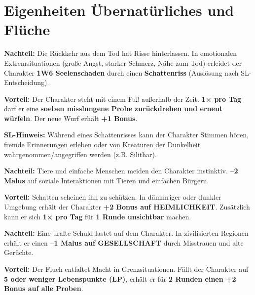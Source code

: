 \section{Eigenheiten Übernatürliches und Flüche}

\begin{traitbox}{}
	
	\textbf{Nachteil:}  
	Die Rückkehr aus dem Tod hat Risse hinterlassen.
	In emotionalen Extremsituationen (große Angst, starker Schmerz, Nähe zum Tod)
	erleidet der Charakter \textbf{1W6 Seelenschaden} durch einen \textbf{Schattenriss}
	(Auslösung nach SL-Entscheidung).
	
	\medskip
	\textbf{Vorteil:}  
	Der Charakter steht mit einem Fuß außerhalb der Zeit.
	\textbf{1× pro Tag} darf er eine \textbf{soeben misslungene Probe}
	\textbf{zurückdrehen und erneut würfeln}.
	Der neue Wurf erhält \textbf{+1 Bonus}.
	
	\medskip
	\textbf{SL-Hinweis:}  
	Während eines Schattenrisses kann der Charakter Stimmen hören,
	fremde Erinnerungen erleben oder von Kreaturen der Dunkelheit wahrgenommen/angegriffen werden (z.B. Silithar).
	
\end{traitbox}

\begin{traitbox}{}
	
	\textbf{Nachteil:}  
	Tiere und einfache Menschen meiden den Charakter instinktiv.
	\textbf{–2 Malus} auf soziale Interaktionen mit Tieren und einfachen Bürgern.
	
	\medskip
	\textbf{Vorteil:}  
	Schatten scheinen ihn zu schützen.
	In dämmriger oder dunkler Umgebung erhält der Charakter
	\textbf{+2 Bonus auf HEIMLICHKEIT}.
	Zusätzlich kann er sich \textbf{1× pro Tag} für \textbf{1 Runde unsichtbar} machen.
	
\end{traitbox}

\begin{traitbox}{}
	
	\textbf{Nachteil:}  
	Eine uralte Schuld lastet auf dem Charakter.
	In zivilisierten Regionen erhält er einen
	\textbf{–1 Malus auf GESELLSCHAFT} durch Misstrauen und alte Gerüchte.
	
	\medskip
	\textbf{Vorteil:}  
	Der Fluch entfaltet Macht in Grenzsituationen.
	Fällt der Charakter auf \textbf{5 oder weniger Lebenspunkte (LP)},
	erhält er für \textbf{2 Runden einen +2 Bonus auf alle Proben}.
	
\end{traitbox}

